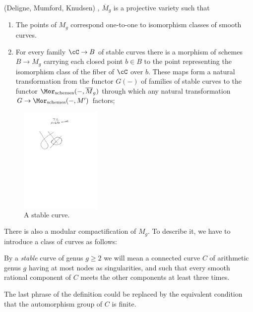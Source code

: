 \begin{theorem}(Deligne, Mumford, Knudsen) \cite{Deligne-Mumford}, \cite{MR702954}\label{DM is coarse}
$\overline M_g$ is a projective variety such that
\begin{enumerate}
 \item The points of $M_g$ correspond one-to-one to isomorphism classes of smooth curves.
 \item For every family $\cC \to B$ of stable curves there is a morphism of schemes $B\to M_g$ carrying
 each closed point  $b \in B$ to the point representing the isomorphism class of the fiber of $\cC$ over $b$. 
 These maps form a natural transformation from the functor $G(-)$ of families of stable curves to the functor 
 $\Mor_{\rm schemes}(-, \overline M_g)$ through which any natural transformation $G \to \Mor_{\rm schemes}(-, M')$
 factors;
\end{enumerate}
\end{theorem}

\begin{figure}\label{Fig7.2}
\begin{center}
\centerline {\includegraphics[height=2in]{"Fig7.2.pdf"}}
\caption{A stable curve.}
\label{default}
\end{center}
\end{figure}



There is also a modular compactification of $M_g$. To describe it, we have to introduce a class of curves as follows:

\begin{definition}
By a \emph{stable} curve of genus $g \geq 2$ we will mean a connected curve $C$ of arithmetic genus $g$ having at most nodes as singularities,  and such that every smooth rational component of $C$ meets the other components at least three times.
\end{definition}

The last phrase of the definition could be replaced by the equivalent condition that the automorphism group
of $C$ is finite.



